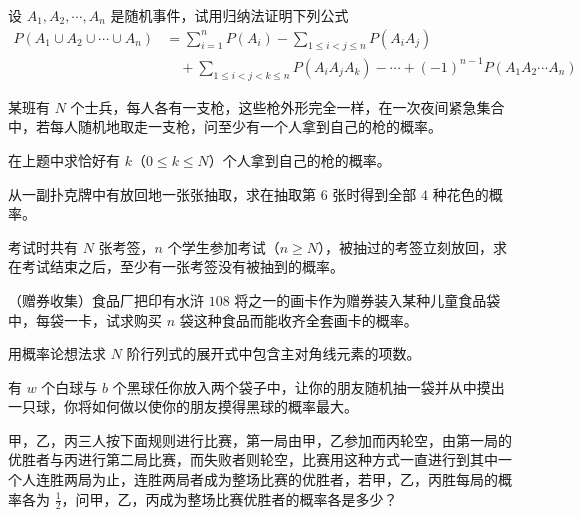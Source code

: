 \documentclass[../../main.tex]{subfiles}
\begin{document}
\begin{exercise}\label{exercise:ch01-33}
设 $A_1,A_2,\cdots,A_n$ 是随机事件，试用归纳法证明下列公式
\begin{align*}
P(A_1\cup A_2\cup\cdots\cup A_n)&=\sum_{i=1}^{n}P(A_i)-\sum_{1\leqslant i<j\leqslant n}P(A_iA_j)\\
&\quad+\sum_{1\leqslant i<j<k\leqslant n}P(A_iA_jA_k)-\cdots+(-1)^{n-1}P(A_1A_2\cdots A_n)
\end{align*}
\end{exercise}

\begin{exercise}\label{exercise:ch01-34}
某班有 $N$ 个士兵，每人各有一支枪，这些枪外形完全一样，在一次夜间紧急集合中，若每人随机地取走一支枪，问至少有一个人拿到自己的枪的概率。
\end{exercise}

\begin{exercise}\label{exercise:ch01-35}
在上题中求恰好有 $k$（$0\leqslant k\leqslant N$）个人拿到自己的枪的概率。
\end{exercise}

\begin{exercise}\label{exercise:ch01-36}
从一副扑克牌中有放回地一张张抽取，求在抽取第 $6$ 张时得到全部 $4$ 种花色的概率。
\end{exercise}

\begin{exercise}\label{exercise:ch01-37}
考试时共有 $N$ 张考签，$n$ 个学生参加考试（$n\geqslant N$），被抽过的考签立刻放回，求在考试结束之后，至少有一张考签没有被抽到的概率。
\end{exercise}

\begin{exercise}\label{exercise:ch01-38}
（赠券收集）食品厂把印有水浒 $108$ 将之一的画卡作为赠券装入某种儿童食品袋中，每袋一卡，试求购买 $n$ 袋这种食品而能收齐全套画卡的概率。
\end{exercise}

\begin{exercise}\label{exercise:ch01-39}
用概率论想法求 $N$ 阶行列式的展开式中包含主对角线元素的项数。
\end{exercise}

\begin{exercise}\label{exercise:ch01-40}
有 $w$ 个白球与 $b$ 个黑球任你放入两个袋子中，让你的朋友随机抽一袋并从中摸出一只球，你将如何做以使你的朋友摸得黑球的概率最大。
\end{exercise}

\begin{exercise}\label{exercise:ch01-41}
甲，乙，丙三人按下面规则进行比赛，第一局由甲，乙参加而丙轮空，由第一局的优胜者与丙进行第二局比赛，而失败者则轮空，比赛用这种方式一直进行到其中一个人连胜两局为止，连胜两局者成为整场比赛的优胜者，若甲，乙，丙胜每局的概率各为 $\frac{1}{2}$，问甲，乙，丙成为整场比赛优胜者的概率各是多少？
\end{exercise}
\end{document}
